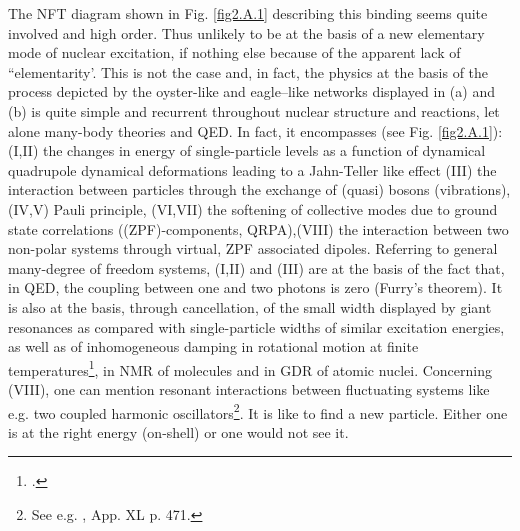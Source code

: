 \begin{subappendices}
The NFT diagram shown in Fig. \ref{fig2.A.1} describing this binding seems quite involved and high order. Thus unlikely to be at the basis of a new elementary mode of nuclear excitation, if nothing else because of the apparent lack of ``elementarity'. This is not the case and, in fact, the physics at the basis of the process depicted by the oyster-like and eagle--like networks displayed in (a) and (b) is quite simple and recurrent throughout nuclear structure and reactions, let alone many-body theories and QED. In fact, it encompasses (see Fig. \ref{fig2.A.1}): (I,II) the changes in energy of single-particle levels as a function of dynamical quadrupole dynamical deformations leading to a Jahn-Teller like effect (III) the interaction between particles through the exchange of (quasi) bosons (vibrations), (IV,V) Pauli principle, (VI,VII) the softening of collective modes due to ground state correlations ((ZPF)-components, QRPA),(VIII) the interaction between two non-polar systems through virtual, ZPF associated dipoles. Referring to general many-degree of freedom systems, (I,II) and (III) are at the basis of the fact that, in QED, the coupling between one and two photons is zero (Furry's theorem). It is also at the basis, through cancellation, of the small width displayed by giant resonances as compared with single-particle widths of similar excitation energies, as well as of inhomogeneous damping in rotational motion at finite temperatures\footnote{\cite{Broglia:87}.}, in NMR of molecules  and in GDR of atomic nuclei. Concerning (VIII), one can mention resonant interactions between fluctuating systems like e.g. two coupled harmonic oscillators\footnote{See e.g. \cite{Born:69}, App. XL p. 471.}. It is like to find a new particle. Either one is at the right energy (on-shell) or one would not see it.


\end{subappendices}
